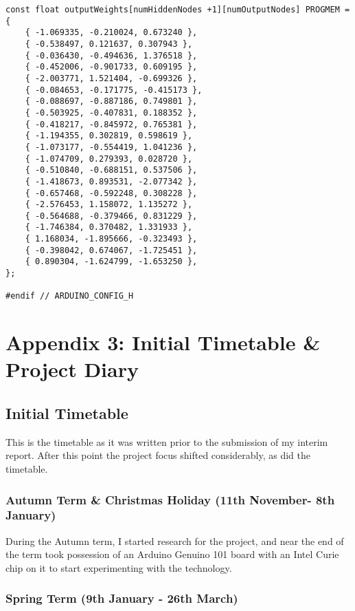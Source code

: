 \documentclass[a4paper]{article}
\begin{document}
\begin{lstlisting}
const float outputWeights[numHiddenNodes +1][numOutputNodes] PROGMEM = {
    { -1.069335, -0.210024, 0.673240 }, 
    { -0.538497, 0.121637, 0.307943 }, 
    { -0.036430, -0.494636, 1.376518 }, 
    { -0.452006, -0.901733, 0.609195 }, 
    { -2.003771, 1.521404, -0.699326 }, 
    { -0.084653, -0.171775, -0.415173 }, 
    { -0.088697, -0.887186, 0.749801 }, 
    { -0.503925, -0.407831, 0.188352 }, 
    { -0.418217, -0.845972, 0.765381 }, 
    { -1.194355, 0.302819, 0.598619 }, 
    { -1.073177, -0.554419, 1.041236 }, 
    { -1.074709, 0.279393, 0.028720 }, 
    { -0.510840, -0.688151, 0.537506 }, 
    { -1.418673, 0.893531, -2.077342 }, 
    { -0.657468, -0.592248, 0.308228 }, 
    { -2.576453, 1.158072, 1.135272 }, 
    { -0.564688, -0.379466, 0.831229 }, 
    { -1.746384, 0.370482, 1.331933 }, 
    { 1.168034, -1.895666, -0.323493 }, 
    { -0.398042, 0.674067, -1.725451 }, 
    { 0.890304, -1.624799, -1.653250 }, 
};

#endif // ARDUINO_CONFIG_H
\end{lstlisting}

\newpage
\section{Appendix 3: Initial Timetable \& Project Diary}
\label{sec:a3}

\subsection{Initial Timetable}%
\label{subsec:a3_it}

This is the timetable as it was written prior to the submission of my interim report. After this point the project focus shifted considerably, as did the timetable.

\subsubsection{Autumn Term \& Christmas Holiday (11th November- 8th January)}

During the Autumn term, I started research for the project, and near the end of the term took possession of an Arduino Genuino 101 board with an Intel Curie chip on it to start experimenting with the technology.

\subsubsection{Spring Term (9th January - 26th March)}
\end{document}
